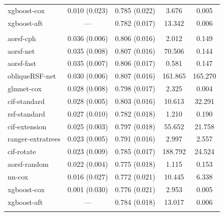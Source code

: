 \documentclass{article}\usepackage[]{graphicx}\usepackage[]{xcolor}
\newenvironment{knitrout}{}{} %
\begin{document}
\begin{knitrout}
\begin{longtable}[t]{lcccc}
\hspace{1em}xgboost-cox & 0.010 (0.023) & 0.785 (0.022) & 3.676 & 0.005\\
\hspace{1em}xgboost-aft & --- & 0.782 (0.017) & 13.342 & 0.006\\
\addlinespace[0.3em]
\multicolumn{5}{l}{\textit{\textbf{JHS; stroke, n = 3639, p = 80}}}\\
\hline
\hspace{1em}aorsf-cph & 0.036 (0.006) & 0.806 (0.016) & 2.012 & 0.149\\
\hspace{1em}aorsf-net & 0.035 (0.008) & 0.807 (0.016) & 70.506 & 0.144\\
\hspace{1em}aorsf-fast & 0.035 (0.007) & 0.806 (0.017) & 0.581 & 0.147\\
\hspace{1em}obliqueRSF-net & 0.030 (0.006) & 0.807 (0.016) & 161.865 & 165.270\\
\hspace{1em}glmnet-cox & 0.028 (0.008) & 0.798 (0.017) & 2.325 & 0.004\\
\hspace{1em}cif-standard & 0.028 (0.005) & 0.803 (0.016) & 10.613 & 32.291\\
\hspace{1em}rsf-standard & 0.027 (0.010) & 0.782 (0.018) & 1.210 & 0.190\\
\hspace{1em}cif-extension & 0.025 (0.003) & 0.797 (0.018) & 55.652 & 21.758\\
\hspace{1em}ranger-extratrees & 0.023 (0.005) & 0.791 (0.016) & 2.997 & 2.557\\
\hspace{1em}cif-rotate & 0.023 (0.009) & 0.785 (0.017) & 188.792 & 24.524\\
\hspace{1em}aorsf-random & 0.022 (0.004) & 0.775 (0.018) & 1.115 & 0.153\\
\hspace{1em}nn-cox & 0.016 (0.027) & 0.772 (0.021) & 10.445 & 6.338\\
\hspace{1em}xgboost-cox & 0.001 (0.030) & 0.776 (0.021) & 2.953 & 0.005\\
\hspace{1em}xgboost-aft & --- & 0.784 (0.018) & 13.017 & 0.006\\
\addlinespace[0.3em]

\end{longtable}
\end{knitrout}
\end{document}
